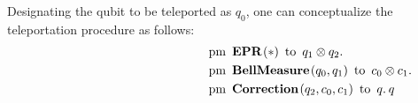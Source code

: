  Designating the qubit to be teleported as $q_0$, one can conceptualize the teleportation procedure as follows:
 \begin{align*}
     \hspace{130 pt}& \text{pm} \hspace{5pt} \textbf{EPR}\hspace{1pt} (*) \hspace{5pt} \text{to} \hspace{5pt}  q_{1} \otimes q_{2}.  \notag \\
     & \text{pm}\hspace{5pt} \textbf{BellMeasure} \hspace{1pt} (q_0,q_{1}) \hspace{5pt}  \text{to} \hspace{5pt} c_{0}\otimes c_{1} . \notag \\
     & \text{pm} \hspace{5pt}  \textbf{Correction} \hspace{1pt} ( q_{2},  c_{0}, c_{1} ) \hspace{5pt} \text{to} \hspace{5pt}  q. \hspace{2pt}  q
 \end{align*}
 

